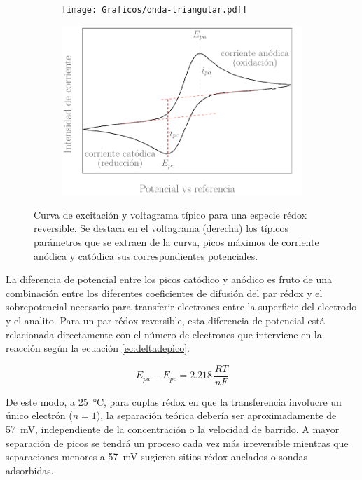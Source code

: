 	 			 \begin{figure}[h!]
			  		  \begin{subfigure}[t]{0.495\textwidth}
			  		  \texttt{[image: Graficos/onda-triangular.pdf]}
			  		  \end{subfigure}
			  		  \begin{subfigure}[t]{0.495\textwidth}
			  		  \includegraphics[width=\textwidth]{Esquemas/CV_ideal.pdf}
			  		  \end{subfigure}
			  		  \caption[Voltamperometría ideal reversible]{Curva de excitación y voltagrama típico para una especie rédox reversible. Se destaca en el voltagrama (derecha) los típicos parámetros que se extraen de la curva, picos máximos de corriente anódica y catódica 
			  		  sus correspondientes potenciales.}
			  		  \label{fig:CV_ideal}
			  		  \end{figure}

			\vspace*{4mm}La diferencia de potencial entre los picos catódico y anódico es fruto de una combinación entre los diferentes coeficientes de difusión del par rédox y el sobrepotencial necesario para transferir electrones entre la superficie del electrodo y el analito. Para un par rédox reversible, esta diferencia de potencial está relacionada directamente con el número de electrones que interviene en la reacción según la ecuación \ref{ec:deltadepico}.

			\begin{equation}	
			E_{pa} - E_{pc} = 2.218 \, \frac{RT}{nF}
			\label{ec:deltadepico}
			\end{equation}

			De este modo, a \SI{25}{\celsius}, para cuplas rédox en que la transferencia involucre un único electrón ($n=1$), la separación teórica debería ser aproximadamente de \SI{57}{\milli\volt}, independiente de la concentración o la velocidad de barrido. A mayor separación de picos se tendrá un proceso cada vez más irreversible mientras que separaciones menores a \SI{57}{\milli\volt} sugieren sitios rédox anclados o sondas adsorbidas.\cite{Wi2000,Bockris1974,Gewirth2004}  
	 		
